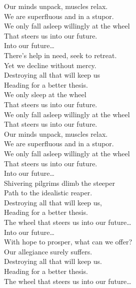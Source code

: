 Our minds unpack, muscles relax. \\
We are superfluous and in a stupor. \\
We only fall asleep willingly at the wheel \\
That steers us into our future. \\

Into our future… \\

There's help in need, seek to retreat. \\
Yet we decline without mercy. \\
Destroying all that will keep us \\
Heading for a better thesis. \\

We only sleep at the wheel \\
That steers us into our future. \\
We only fall asleep willingly at the wheel \\
That steers us into our future. \\

Our minds unpack, muscles relax. \\
We are superfluous and in a stupor. \\
We only fall asleep willingly at the wheel \\
That steers us into our future. \\

Into our future… \\

Shivering pilgrims dlimb the steeper \\
Path to the idealistic reaper. \\
Destroying all that will keep us, \\
Heading for a better thesis. \\

The wheel that steers us into our future… \\

Into our future… \\

With hope to prosper, what can we offer? \\
Our allegiance surely suffers. \\
Destroying all that will keep us. \\
Heading for a better thesis. \\

The wheel that steers us into our future… \\
